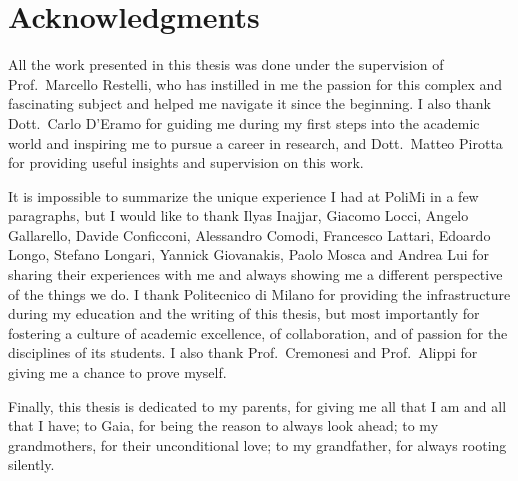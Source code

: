 \chapter*{Acknowledgments}



All the work presented in this thesis was done under the supervision of 
Prof.\ Marcello Restelli, who has instilled in me the passion for this complex 
and fascinating subject and helped me navigate it since the beginning. 
I also thank Dott.\ Carlo D'Eramo for guiding me during my first steps into the 
academic world and inspiring me to pursue a career in research, and Dott.\ Matteo
Pirotta for providing useful insights and supervision on this work.

It is impossible to summarize the unique experience I had at PoliMi in a few
paragraphs, but I would like to thank Ilyas Inajjar, Giacomo Locci, Angelo 
Gallarello, Davide Conficconi, Alessandro Comodi, Francesco Lattari, Edoardo
Longo, Stefano Longari, Yannick Giovanakis, Paolo Mosca and Andrea Lui for 
sharing their experiences with me and always showing me a different perspective
of the things we do. 
I thank Politecnico di Milano for providing the infrastructure during my education
and the writing of this thesis, but most importantly for fostering a culture 
of academic excellence, of collaboration, and of passion for the disciplines
of its students.
I also thank Prof.\ Cremonesi and Prof.\ Alippi for giving me a chance to prove 
myself.

Finally, this thesis is dedicated to my parents, for giving me all that I am and
all that I have; 
to Gaia, for being the reason to always look ahead;
to my grandmothers, for their unconditional love; 
to my grandfather, for always rooting silently.